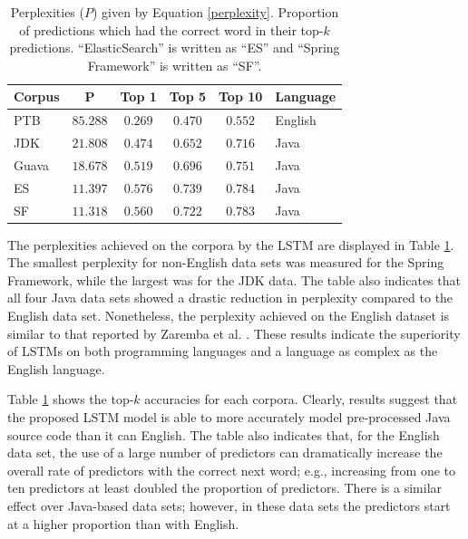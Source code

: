 \documentclass[runningheads,a4paper]{llncs}
\newcommand{\tabhorzspacing}{0.5em}
\newcommand{\tabvertspacing}{1.1}
\begin{document}
\begin{table}[t]
    \caption{Perplexities ($P$) given by Equation \ref{perplexity}.
    Proportion of predictions which had the correct
    word in their top-$k$ predictions.
    ``ElasticSearch'' is written as ``ES'' and ``Spring
    Framework'' is written as ``SF''.}
    \label{topk-table}
    \vskip 0.15in
    \begin{center}
    \setlength{\tabcolsep}{\tabhorzspacing}
    {\renewcommand{\arraystretch}{\tabvertspacing}
    \begin{tabular}{lccccl}
    \hline
    Corpus & P & Top 1 & Top 5 & Top 10 & Language \\
    \hline
    PTB   & $85.288$ & $0.269$ & $0.470$ & $0.552$ & English \\
    JDK   & $21.808$ & $0.474$ & $0.652$ & $0.716$ & Java \\
    Guava & $18.678$ & $0.519$ & $0.696$ & $0.751$ & Java \\
    ES    & $11.397$ & $0.576$ & $0.739$ & $0.784$ & Java \\
    SF    & $11.318$ & $0.560$ & $0.722$ & $0.783$ & Java \\
    \hline
    \end{tabular}}
    \end{center}
    \vskip -0.1in
\end{table}

The perplexities achieved on the corpora by the LSTM are displayed in
Table \ref{topk-table}. The smallest perplexity for non-English data sets 
was measured for the Spring Framework, while the largest was for the JDK data. 
The table also indicates that all four Java data sets showed a drastic 
reduction in perplexity compared to the English data set. Nonetheless, the 
perplexity achieved on the English dataset is similar to that reported by 
Zaremba et al. \cite{Zaremba}. These results indicate the superiority of LSTMs on both
programming languages and a language as complex as the English language.

Table \ref{topk-table} shows the top-$k$ accuracies for each corpora.
Clearly, results suggest that the proposed LSTM model is able to more
accurately model pre-processed Java source code than it can English. The table
also indicates that, for the English data set, the use of a large number of
predictors can dramatically increase the overall rate of predictors with the
correct next word; e.g., increasing from one to ten predictors at least doubled
the proportion of predictors. There is a similar effect over Java-based data
sets; however, in these data sets the predictors start at a higher proportion
than with English.
\end{document}
